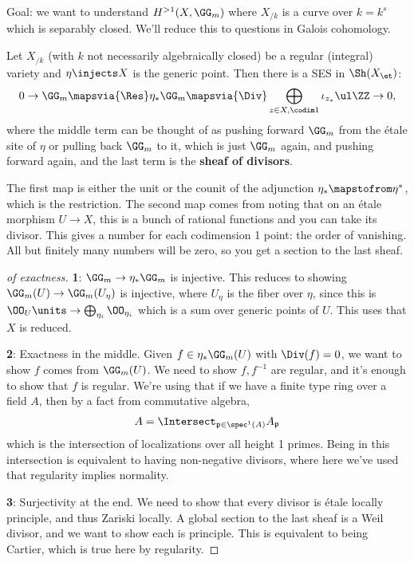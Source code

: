 Goal: we want to understand \(H^{>1}(X, \GG_m)\) where \(X_{/k}\) is a
curve over \(k = k^{s}\) which is separably closed. We'll reduce this to
questions in Galois cohomology.

\begin{proposition}[?]

Let \(X_{/k}\) (with \(k\) not necessarily algebraically closed) be a
regular (integral) variety and \(\eta\injects X\) is the generic point.
Then there is a SES in \(\Sh(X_\et)\):
\begin{align*}  
0 \to
\GG_m
\mapsvia{\Res}
\eta_* \GG_m 
\mapsvia{\Div}
\bigoplus_{z\in X, \codim 1} \iota_{z_*} \ul \ZZ
\to 0
,\end{align*} where the middle term can be thought of as pushing forward
\(\GG_m\) from the étale site of \(\eta\) or pulling back \(\GG_m\) to
it, which is just \(\GG_m\) again, and pushing forward again, and the
last term is the \textbf{sheaf of divisors}.

\end{proposition}

\begin{remark}

The first map is either the unit or the counit of the adjunction
\(\eta_* \mapstofrom \eta^*\), which is the restriction. The second map
comes from noting that on an étale morphism \(U\to X\), this is a bunch
of rational functions and you can take its divisor. This gives a number
for each codimension 1 point: the order of vanishing. All but finitely
many numbers will be zero, so you get a section to the last sheaf.

\end{remark}

\begin{proof}[of exactness]

\textbf{1}: \(\GG_m \to \eta_* \GG_m\) is injective. This reduces to
showing \(\GG_m(U) \to \GG_m(U_\eta)\) is injective, where \(U_\eta\) is
the fiber over \(\eta\), since this is
\(\OO_U\units \to \bigoplus_{\eta_i} \OO_{\eta_i}\) which is a sum over
generic points of \(U\). This uses that \(X\) is reduced.

\textbf{2}: Exactness in the middle. Given \(f\in \eta_* \GG_m(U)\) with
\(\Div(f) = 0\), we want to show \(f\) comes from \(\GG_m(U)\). We need
to show \(f, f^{-1}\) are regular, and it's enough to show that \(f\) is
regular. We're using that if we have a finite type ring over a field
\(A\), then by a fact from commutative algebra,
\begin{align*}
A = \Intersect_{\mathfrak{p}\in \spec^1(A)} A_{\mathfrak{p}}
\end{align*} which is the intersection of localizations over all height
1 primes. Being in this intersection is equivalent to having
non-negative divisors, where here we've used that regularity implies
normality.

\textbf{3}: Surjectivity at the end. We need to show that every divisor
is étale locally principle, and thus Zariski locally. A global section
to the last sheaf is a Weil divisor, and we want to show each is
principle. This is equivalent to being Cartier, which is true here by
regularity.

\end{proof}

